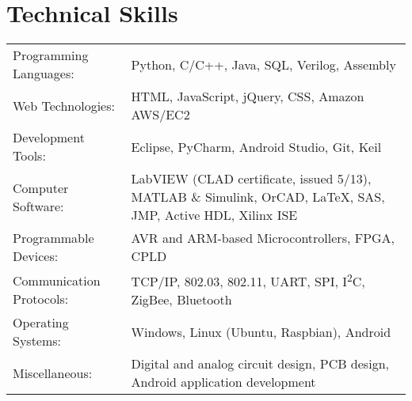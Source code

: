 \documentclass[10pt]{article}
\newlength{\WidthSkills}
\newlength{\WidthSkills}
\begin{document}
\section{Technical Skills}

\begin{flushleft}

\begin{tabular}{l p{\WidthSkills}}
    Programming Languages: & Python, C/C++, Java, SQL, Verilog, Assembly \\
    Web Technologies: & HTML, JavaScript, jQuery, CSS, Amazon AWS/EC2 \\
    Development Tools: & Eclipse, PyCharm, Android Studio, Git, Keil \\
    Computer Software: & LabVIEW (CLAD certificate, issued 5/13), MATLAB \& Simulink, OrCAD, \LaTeX, SAS, JMP, Active HDL, Xilinx ISE \\
    Programmable Devices: & AVR and ARM-based Microcontrollers, FPGA, CPLD \\
    Communication Protocols: & TCP/IP, 802.03, 802.11, UART, SPI, I\textsuperscript{2}C, ZigBee, Bluetooth \\
    Operating Systems: & Windows, Linux (Ubuntu, Raspbian), Android \\
    Miscellaneous: & Digital and analog circuit design, PCB design, Android application development
\end{tabular}

\end{flushleft}
\end{document}
